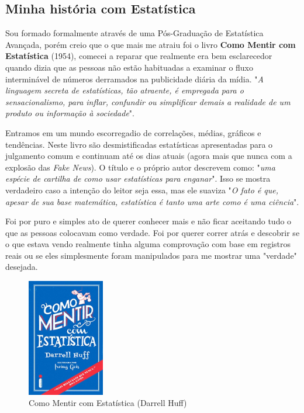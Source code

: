 \documentclass[a4paper,11pt]{article}
\begin{document}
\subsection{Minha história com Estatística}
Sou formado formalmente através de uma Pós-Graduação de Estatística Avançada, porém creio que o que mais me atraiu foi o livro \textbf{Como Mentir com Estatística} (1954), comecei a reparar que realmente era bem esclarecedor quando dizia que as pessoas não estão habituadas a examinar o fluxo interminável de números derramados na publicidade diária da mídia. "\textit{A linguagem secreta de estatísticas, tão atraente, é empregada para o sensacionalismo, para inflar, confundir ou simplificar demais a realidade de um produto ou informação à sociedade}".

Entramos em um mundo escorregadio de correlações, médias, gráficos e tendências. Neste livro são desmistificadas estatísticas apresentadas para o julgamento comum e continuam até os dias atuais (agora mais que nunca com a explosão das \textit{Fake News}). O título e o próprio autor descrevem como: "\textit{uma espécie de cartilha de como usar estatísticas para enganar}". Isso se mostra verdadeiro caso a intenção do leitor seja essa, mas ele suaviza "\textit{O fato é que, apesar de sua base matemática, estatística é tanto uma arte como é uma ciência}".

Foi por puro e simples ato de querer conhecer mais e não ficar aceitando tudo o que as pessoas colocavam como verdade. Foi por querer correr atrás e descobrir se o que estava vendo realmente tinha alguma comprovação com base em registros reais ou se eles simplesmente foram manipulados para me mostrar uma "verdade" desejada.
\begin{figure}[H]
	\centering
	\includegraphics[width=0.3\textwidth]{imagens/livro.jpeg}
	\caption{Como Mentir com Estatística (Darrell Huff)}
\end{figure}
\end{document}

